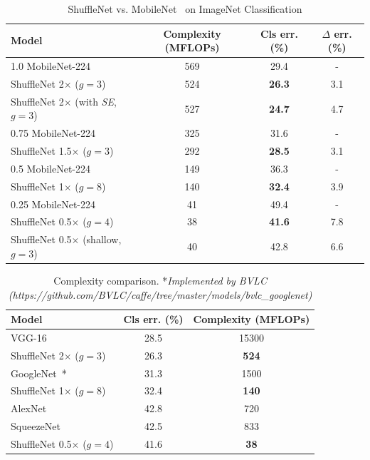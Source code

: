 \documentclass[10pt,twocolumn,letterpaper]{article}
\begin{document}
\begin{table}[h]
	\begin{center}
		\begin{tabular}{l|c|c|c}
			\hline
			Model & Complexity (MFLOPs) & Cls err. (\%) & $\Delta$ err. (\%) \\
			\hline\hline
			1.0 MobileNet-224 & 569 & 29.4 & - \\
			ShuffleNet 2$\times$ ($g=3$) & 524 & \textbf{26.3} & 3.1 \\
			ShuffleNet 2$\times$ (with \emph{SE}\cite{hu2017squeeze}, $g=3$) & 527 & \textbf{24.7} & 4.7 \\
			\hline
			0.75 MobileNet-224 & 325 & 31.6 & - \\
			ShuffleNet 1.5$\times$ ($g=3$) & 292 & \textbf{28.5} & 3.1 \\
			\hline
			0.5 MobileNet-224 & 149 & 36.3 & - \\
			ShuffleNet 1$\times$ ($g=8$) & 140 & \textbf{32.4} & 3.9 \\
			\hline
			0.25 MobileNet-224 & 41 & 49.4 & - \\
			ShuffleNet 0.5$\times$ ($g=4$) & 38 & \textbf{41.6} & 7.8 \\
			ShuffleNet 0.5$\times$ (shallow, $g=3$) & 40 & 42.8 & 6.6 \\
			\hline
		\end{tabular}
	\end{center}
	\caption{ ShuffleNet vs. MobileNet~\cite{howard2017mobilenets} on ImageNet Classification }%
	\label{tbl:mobilecls}
\end{table}

\begin{table}[h]
	\begin{center}
		\begin{tabular}{l|c|c}
			\hline
			Model & Cls err. (\%) & Complexity (MFLOPs) \\
			\hline\hline
			VGG-16~\cite{simonyan2014very} & 28.5 & 15300 \\
			ShuffleNet 2$\times$ ($g=3$) & 26.3 & \textbf{524} \\
			\hline
			GoogleNet~\cite{szegedy2015going}* & 31.3 & 1500 \\
			ShuffleNet 1$\times$ ($g=8$) & 32.4 & \textbf{140} \\
			\hline
			AlexNet~\cite{krizhevsky2012imagenet} & 42.8 & 720 \\
			SqueezeNet~\cite{iandola2016squeezenet} & 42.5 & 833 \\
			ShuffleNet 0.5$\times$ ($g=4$) & 41.6 & \textbf{38} \\
			\hline 
		\end{tabular}
	\end{center}
	\caption{ Complexity comparison. *\emph{Implemented by BVLC (https://github.com/BVLC/caffe/tree/master/models/bvlc\_googlenet)} }
	\label{tbl:complexity}
\end{table}
\end{document}
